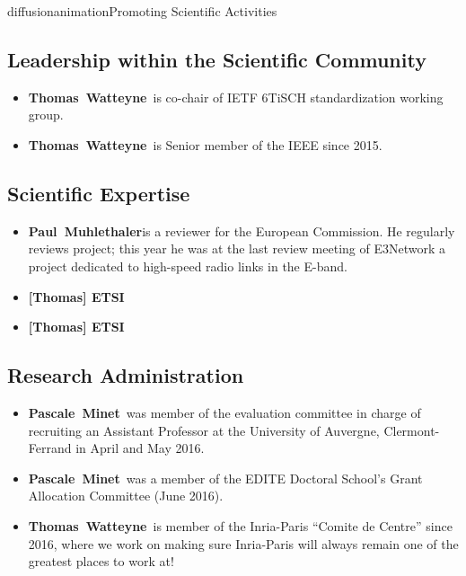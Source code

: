 \documentclass{ra2016}
\newcommand{\paul}             {\textbf{Paul~Muhlethaler}}
\newcommand{\pascale}          {\textbf{Pascale~Minet}}
\newcommand{\thomas}           {\textbf{Thomas~Watteyne}}
\newcommand{\commentthomas}[1] {\textbf{[Thomas] #1}}
\begin{document}
\begin{module}{diffusion}{animation}{Promoting Scientific Activities}
\subsection{Leadership within the Scientific Community}

\begin{itemize}
    \item \thomas~is co-chair of IETF 6TiSCH standardization working group.
    \item \thomas~is Senior member of the IEEE since 2015.
\end{itemize}

\subsection{Scientific Expertise}

\begin{itemize}
    \item \paul is a reviewer for the European Commission.
        He regularly reviews project; this year he was at the last review meeting of E3Network a project dedicated to high-speed radio links in the E-band.
    \item \commentthomas{ETSI}
    \item \commentthomas{ETSI}
\end{itemize}

\subsection{Research Administration}

\begin{itemize}
    \item \pascale~was member of the evaluation committee in charge of recruiting an Assistant Professor at the University of Auvergne, Clermont-Ferrand in April and May 2016.
    \item \pascale~was a member of the EDITE Doctoral School's Grant Allocation Committee (June 2016).
    \item \thomas~is member of the Inria-Paris ``Comite de Centre'' since 2016, where we work on making sure Inria-Paris will always remain one of the greatest places to work at!
\end{itemize}

\end{module}
\end{document}
